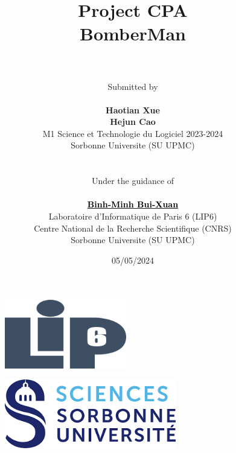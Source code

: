\documentclass[11pt,english]{article}
\begin{document}
\title
{
    \textbf{Project CPA \\ BomberMan\\}
}

\author
{
    \\
    \\
    Submitted by
    \\
    \\
    \textbf{Haotian Xue}
    \\
    \textbf{Hejun Cao}
    \\
    M1 Science et Technologie du Logiciel 2023-2024
    \\
    Sorbonne Universite (SU UPMC)
    \\
    \\
    \\
    Under the guidance of 
    \\
    \\
    \textbf{\href{https://www-npa.lip6.fr/~buixuan/}{\textcolor{black}{Binh-Minh Bui-Xuan}}}
    \\
    Laboratoire d'Informatique de Paris 6 (LIP6)
    \\
    Centre National de la Recherche Scientifique (CNRS)
    \\
    Sorbonne Universite (SU UPMC)
}

\date{05/05/2024}

\maketitle

\begin{figure}[htbp]
    \begin{center}
        \includegraphics[height=3cm]{./src/logo_lip6.png}
    \end{center}
\end{figure}

\begin{figure}[htbp]
    \begin{center}
        \includegraphics[height=3cm]{./src/Science_Sorbonne_logo.png}
    \end{center}
\end{figure}
\end{document}
